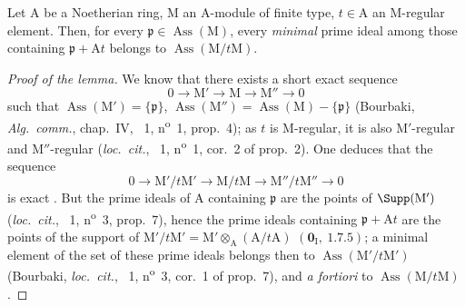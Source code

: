 \begin{lemma}[16.4.6.3]
\label{0.16.4.6.3}
Let $\mathrm{A}$ be a Noetherian ring, $\mathrm{M}$ an $\mathrm{A}$-module of finite type, $t\in\mathrm{A}$ an $\mathrm{M}$-regular element.
Then, for every $\mathfrak{p}\in\operatorname{Ass}(\mathrm{M})$, every \emph{minimal} prime ideal among those containing $\mathfrak{p}+\mathrm{A}t$ belongs to $\operatorname{Ass}(\mathrm{M}/t\mathrm{M})$.
\end{lemma}

\begin{proof}[Proof of the lemma]
We know that there exists a short exact sequence
\[
  0\to\mathrm{M}'\to\mathrm{M}\to\mathrm{M}''\to 0
\]
such that $\operatorname{Ass}(\mathrm{M}')=\{\mathfrak{p}\}$, $\operatorname{Ass}(\mathrm{M}'')=\operatorname{Ass}(\mathrm{M})-\{\mathfrak{p}\}$ (Bourbaki, \emph{Alg.~comm.}, chap.~IV, \textsection~1, n\textsuperscript{o}~1, prop.~4); as $t$ is $\mathrm{M}$-regular, it is also $\mathrm{M}'$-regular and $\mathrm{M}''$-regular (\emph{loc.~cit.}, \textsection~1, n\textsuperscript{o}~1, cor.~2 of prop.~2).
One deduces that the sequence
\[
  0\to\mathrm{M}'/t\mathrm{M}'\to\mathrm{M}/t\mathrm{M}\to\mathrm{M}''/t\mathrm{M}''\to 0
\]
is exact .
But the prime ideals of $\mathrm{A}$ containing $\mathfrak{p}$ are the points of $\Supp(\mathrm{M}')$ (\emph{loc.~cit.}, \textsection~1, n\textsuperscript{o}~3, prop.~7), hence the prime ideals containing $\mathfrak{p}+\mathrm{A}t$ are the points of the support of $\mathrm{M}'/t\mathrm{M}'=\mathrm{M}'\otimes_\mathrm{A}(\mathrm{A}/t\mathrm{A})$ $(\mathbf{0}_\mathrm{I},~1.7.5)$; a minimal element of the set of these prime ideals belongs then to $\operatorname{Ass}(\mathrm{M}'/t\mathrm{M}')$ (Bourbaki, \emph{loc.~cit.}, \textsection~1, n\textsuperscript{o}~3, cor.~1 of prop.~7), and \emph{a fortiori} to $\operatorname{Ass}(\mathrm{M}/t\mathrm{M})$.
\end{proof}

